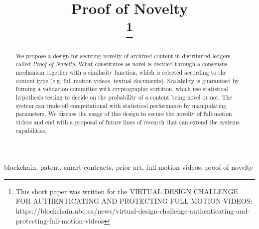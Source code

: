 \documentclass[conference]{IEEEtran}
\begin{document}
\title{Proof of Novelty\\
\thanks{This short paper was written for the VIRTUAL DESIGN CHALLENGE FOR AUTHENTICATING AND PROTECTING FULL MOTION VIDEOS: https://blockchain.ubc.ca/news/virtual-design-challenge-authenticating-and-protecting-full-motion-videos}}

\author{
}

\maketitle
\begin{abstract}
We propose a design for securing novelty of archived content in distributed ledgers, called \emph{Proof of Novelty}. What constitutes as novel is decided through a consensus mechanism together with a similarity function, which is selected according to the content type (e.g. full-motion videos, textual documents). Scalability is guaranteed by forming a validation committee with cryptographic sortition, which use statistical hypothesis testing to decide on the probability of a content being novel or not. The system can trade-off computational with statistical performance by manipulating parameters. We discuss the usage of this design to secure the novelty of full-motion videos and end with a proposal of future lines of research that can extend the systems capabilities.
\end{abstract}

\begin{IEEEkeywords}
blockchain, patent, smart contracts, prior art, full-motion videos, proof of novelty
\end{IEEEkeywords}
\end{document}
